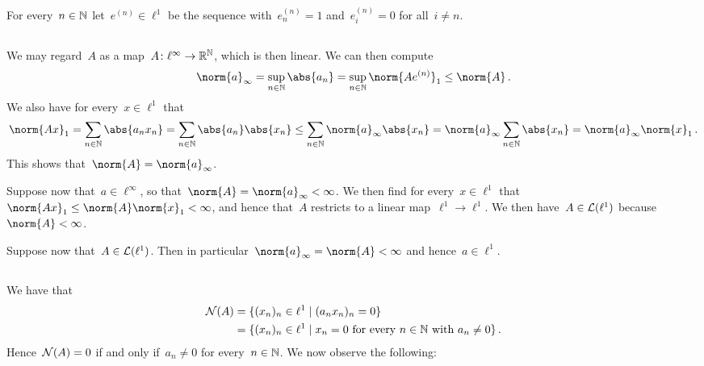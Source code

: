 \section{}

For every~$n \in \mathbb{N}$ let~$e^{(n)} \in \ell^1$ be the sequence with~$e^{(n)}_n = 1$ and~$e^{(n)}_i = 0$ for all~$i \neq n$.





\subsection{}

We may regard~$A$ as a map~$A \colon \ell^\infty \to \mathbb{R}^{\mathbb{N}}$, which is then linear.
We can then compute
\[
        \norm{a}_\infty
  =     \sup_{n \in \Natural} \abs{a_n}
  =     \sup_{n \in \Natural} \norm{A e^{(n)}}_1
  \leq  \norm{A} \,.
\]
We also have for every~$x \in \ell^1$ that
\[
        \norm{Ax}_1
  =     \sum_{n \in \Natural} \abs{a_n x_n}
  =     \sum_{n \in \Natural} \abs{a_n} \abs{x_n}
  \leq  \sum_{n \in \Natural} \norm{a}_\infty \abs{x_n}
  =     \norm{a}_\infty \sum_{n \in \Natural} \abs{x_n}
  =     \norm{a}_\infty \norm{x}_1  \,.
\]
This shows that~$\norm{A} = \norm{a}_\infty$.

Suppose now that~$a \in \ell^\infty$, so that~$\norm{A} = \norm{a}_\infty < \infty$.
We then find for every~$x \in \ell^1$ that~$\norm{Ax}_1 \leq \norm{A} \norm{x}_1 < \infty$, and hence that~$A$ restricts to a linear map~$\ell^1 \to \ell^1$.
We then have~$A \in \mathcal{L}(\ell^1)$ because~$\norm{A} < \infty$.

Suppose now that~$A \in \mathcal{L}(\ell^1)$.
Then in particular~$\norm{a}_\infty = \norm{A} < \infty$ and hence~$a \in \ell^1$.





\subsection{}

We have that
\begin{align*}
      \Null(A)
  &=  \{
        (x_n)_n \in \ell^1
      \suchthat
        (a_n x_n)_n = 0
      \}  \\
  &=  \{
        (x_n)_n \in \ell^1
      \suchthat
        \text{$x_n = 0$ for every~$n \in \Natural$ with~$a_n \neq 0$}
      \} \,.
\end{align*}
Hence~$\mathcal{N}(A) = 0$ if and only if~$a_n \neq 0$ for every~$n \in \mathbb{N}$.
We now observe the following:

